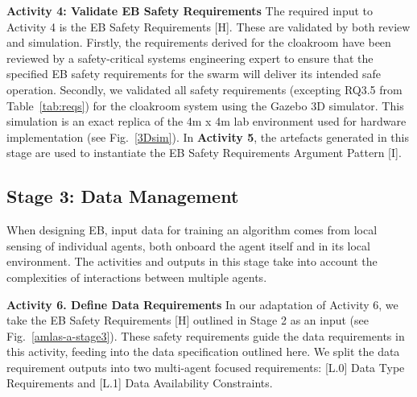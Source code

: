 \documentclass[runningheads]{llncs}
\begin{document}
%
\noindent\textbf{Activity 4: Validate EB Safety Requirements} The required input to Activity 4 is the EB Safety Requirements [H].  
These
are validated by both review and simulation.
Firstly, the requirements derived for the cloakroom have been reviewed by a safety-critical systems engineering expert to ensure that the specified EB safety requirements for the swarm will deliver its intended safe operation. Secondly, we validated all safety requirements (excepting RQ3.5 from Table~\ref{tab:reqs}) for the cloakroom system using the Gazebo 3D simulator. 
This simulation is an exact replica of the 4m x 4m lab environment used for hardware implementation (see Fig.~\ref{3Dsim}). 
In \textbf{Activity 5}, the artefacts generated in this stage are used to instantiate the EB Safety Requirements Argument Pattern [I].

\subsection{Stage 3: Data Management} \label{framework-stage3}
When designing EB, input data for training an algorithm comes from local sensing of individual agents, both onboard the agent itself and in its local environment. The activities and outputs in this stage take into account the complexities of interactions between multiple agents.


\noindent\textbf{Activity 6. Define Data Requirements} In our adaptation of Activity 6, we take the EB Safety Requirements [H] outlined in Stage 2 as an input (see Fig.~\ref{amlas-a-stage3}). These safety requirements guide the data requirements in this activity, feeding into the data specification outlined here. We split the data requirement outputs into two multi-agent focused requirements: [L.0] Data Type Requirements and [L.1] Data Availability Constraints.
\end{document}
